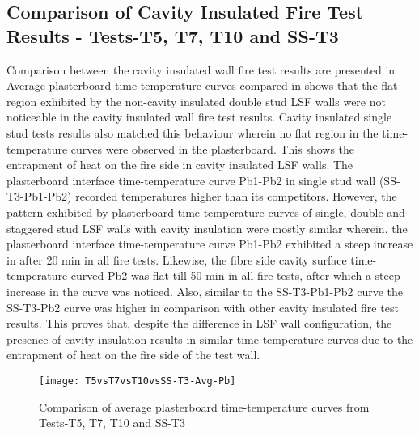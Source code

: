\subsection{Comparison of Cavity Insulated Fire Test Results - Tests-T5, T7, T10 and SS-T3}

Comparison between the cavity insulated wall fire test results are presented in . Average plasterboard time-temperature curves compared in  shows that the flat region exhibited by the non-cavity insulated double stud LSF walls were not noticeable in the cavity insulated wall fire test results. Cavity insulated single stud tests results also matched this behaviour wherein no flat region in the time-temperature curves were observed in the plasterboard. This shows the entrapment of heat on the fire side in cavity insulated LSF walls. The plasterboard interface time-temperature curve Pb1-Pb2 in single stud wall (SS-T3-Pb1-Pb2) recorded temperatures higher than its competitors. However, the pattern exhibited by plasterboard time-temperature curves of single, double and staggered stud LSF walls with cavity insulation were mostly similar wherein, the plasterboard interface time-temperature curve Pb1-Pb2 exhibited a steep increase in after 20 min in all fire tests. Likewise, the fibre side cavity surface time-temperature curved Pb2 was flat till 50 min in all fire tests, after which a steep increase in the curve was noticed. Also, similar to the SS-T3-Pb1-Pb2 curve the SS-T3-Pb2 curve was higher in comparison with other cavity insulated fire test results. This proves that, despite the difference in LSF wall configuration, the presence of cavity insulation results in similar time-temperature curves due to the entrapment of heat on the fire side of the test wall.
\begin{figure}[!htbp]
	\centering
		\texttt{[image: T5vsT7vsT10vsSS-T3-Avg-Pb]}  
	\caption{Comparison of average plasterboard time-temperature curves from Tests-T5, T7, T10 and SS-T3}
	\label{fig:T5vsT7vsT10vsSS-T3-Avg-Pb}
\end{figure}

